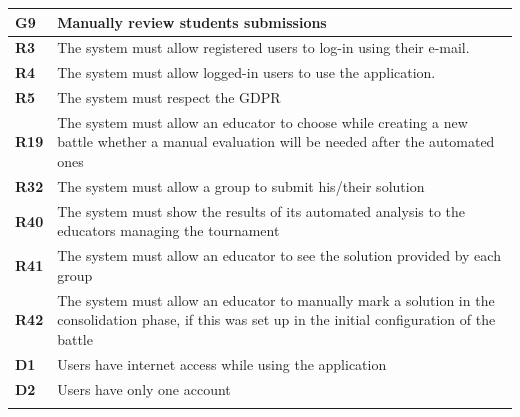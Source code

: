 \documentclass[../RASD.tex]{subfiles}
\begin{document}
        \begin{table}[h!]
            \begin{center}
                \begin{tabular}{|m{2em}|m{30em}|}
                \hline
                \rowcolor{ReqMappingRow1}
                \textbf{G9} & \textbf{Manually review students submissions}\\
                \hline
                \cellcolor{ReqMappingCell2}
                \textbf{R3} & The system must allow registered users to log-in using their e-mail.\\
                \hline
                \cellcolor{ReqMappingCell2}
                \textbf{R4} & The system must allow logged-in users to use the application.\\
                \hline
                \cellcolor{ReqMappingCell2}
                \textbf{R5} & The system must respect the GDPR\\
                \hline
                \cellcolor{ReqMappingCell2}
                \textbf{R19} & The system must allow an educator to choose while creating a new battle whether a manual evaluation will be needed after the automated ones\\
                \hline
                \cellcolor{ReqMappingCell2}
                \textbf{R32} & The system must allow a group to submit his/their solution\\
                \hline
                \cellcolor{ReqMappingCell2}
                \textbf{R40} & The system must show the results of its automated analysis to the educators managing the tournament\\
                \hline
                \cellcolor{ReqMappingCell2}
                \textbf{R41} & The system must allow an educator to see the solution provided by each group\\
                \hline
                \cellcolor{ReqMappingCell2}
                \textbf{R42} & The system must allow an educator to manually mark a solution in the consolidation phase, if this was set up in the initial configuration of the battle\\
                \hline
                \cellcolor{ReqMappingCell3}
                \textbf{D1} & Users have internet access while using the application\\
                \hline
                \cellcolor{ReqMappingCell3}
                \textbf{D2} & Users have only one account\\
                \hline
                \cellcolor{ReqMappingCell3}

\end{tabular}
\end{center}
\end{table}
\end{document}
